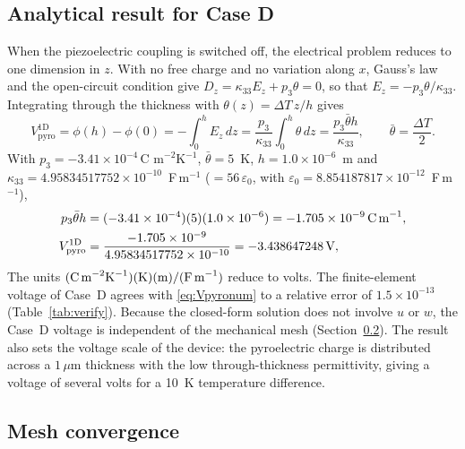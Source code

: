 \documentclass[a4paper, 11pt, twoside]{article}
\begin{document}
\subsection{Analytical result for Case D}
\label{sec:caseD}

When the piezoelectric coupling is switched off, the electrical problem reduces to one
dimension in $z$. With no free charge and no variation along $x$, Gauss's law and the
open-circuit condition give
$D_z=\kappa_{33}E_z+p_3\theta=0$, so that
$E_z=-p_3\theta/\kappa_{33}$. Integrating through the thickness with
$\theta(z)=\Delta T\,z/h$ gives
\begin{equation}
V_{\mathrm{pyro}}^{\mathrm{1D}}=\phi(h)-\phi(0)
=-\int_0^h E_z\,dz
=\frac{p_3}{\kappa_{33}}\int_0^h\theta\,dz
=\frac{p_3\bar\theta h}{\kappa_{33}},
\qquad
\bar\theta=\frac{\Delta T}{2}.
\label{eq:Vpyro}
\end{equation}
With $p_3=-3.41\times10^{-4}\,\text{C m}^{-2}\text{K}^{-1}$,
$\bar\theta=5$~K, $h=1.0\times10^{-6}$~m and
$\kappa_{33}=4.95834517752\times10^{-10}$~F\,m$^{-1}$
($=56\,\varepsilon_0$, with $\varepsilon_0=8.854187817\times10^{-12}$~F\,m$^{-1}$),
\begin{align}
p_3\bar\theta h
&=(-3.41\times10^{-4})(5)(1.0\times10^{-6})
=-1.705\times10^{-9}\,\text{C\,m}^{-1},
\notag\\
V_{\mathrm{pyro}}^{\mathrm{1D}}
&=\frac{-1.705\times10^{-9}}{4.95834517752\times10^{-10}}
=-3.438647248\,\text{V},
\label{eq:Vpyronum}
\end{align}
The units
$(\text{C\,m}^{-2}\text{K}^{-1})(\text{K})(\text{m})/
(\text{F\,m}^{-1})$ reduce to volts. The finite-element voltage of Case~D agrees
with \eqref{eq:Vpyronum} to a relative error of $1.5\times10^{-13}$
(Table~\ref{tab:verify}). Because the closed-form solution does not involve $u$ or
$w$, the Case~D voltage is independent of the mechanical mesh
(Section~\ref{sec:mesh-convergence}). The result also sets the voltage scale of the
device: the pyroelectric charge is distributed across a $1\,\mu$m thickness with the
low through-thickness permittivity, giving a voltage of several volts for a 10~K
temperature difference.

\subsection{Mesh convergence}
\label{sec:mesh-convergence}
\end{document}
